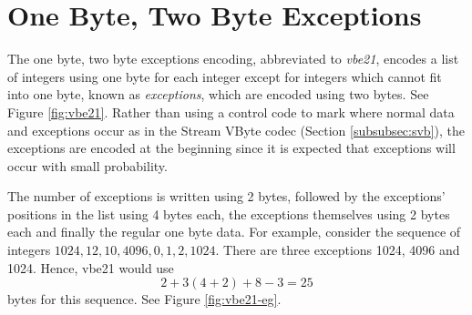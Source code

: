 \section{One Byte, Two Byte Exceptions}
\label{sec:vbbe21}


The one byte, two byte exceptions encoding, abbreviated to \textit{vbe21},
encodes a list of integers using one byte for each integer except for integers
which cannot fit into one byte, known as \textit{exceptions}, which are encoded
using two bytes. See Figure \ref{fig:vbe21}. Rather than using a control code to
mark where normal data and exceptions occur as in the Stream VByte codec
(Section \ref{subsubsec:svb}), the exceptions are encoded at the beginning since
it is expected that exceptions will occur with small probability.

The number of exceptions is written using 2 bytes, followed by the exceptions'
positions in the list using 4 bytes each, the exceptions themselves using 2
bytes each and finally the regular one byte data. For example, consider the
sequence of integers $1024,12,10,4096,0,1,2,1024$. There are three
exceptions 1024, 4096 and 1024. Hence, vbe21 would use
\[ 2 + 3(4+2) + 8-3 = 25 \]
bytes for this sequence. See Figure \ref{fig:vbe21-eg}.



